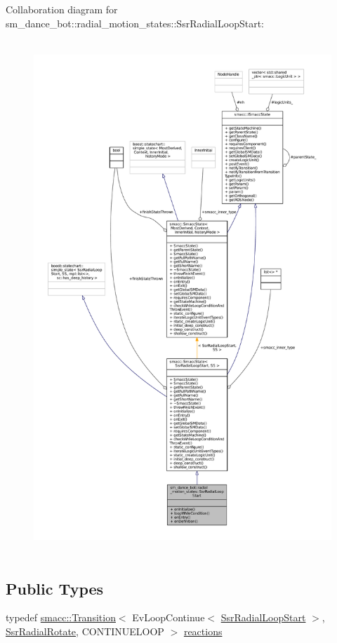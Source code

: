 Collaboration diagram for sm\+\_\+dance\+\_\+bot\+:\+:radial\+\_\+motion\+\_\+states\+:\+:Ssr\+Radial\+Loop\+Start\+:
\nopagebreak
\begin{figure}[H]
\begin{center}
\leavevmode
\includegraphics[height=550pt]{structsm__dance__bot_1_1radial__motion__states_1_1SsrRadialLoopStart__coll__graph}
\end{center}
\end{figure}
\subsection*{Public Types}
\begin{DoxyCompactItemize}
\item 
typedef \hyperlink{classsmacc_1_1Transition}{smacc\+::\+Transition}$<$ Ev\+Loop\+Continue$<$ \hyperlink{structsm__dance__bot_1_1radial__motion__states_1_1SsrRadialLoopStart}{Ssr\+Radial\+Loop\+Start} $>$, \hyperlink{structsm__dance__bot_1_1radial__motion__states_1_1SsrRadialRotate}{Ssr\+Radial\+Rotate}, C\+O\+N\+T\+I\+N\+U\+E\+L\+O\+OP $>$ \hyperlink{structsm__dance__bot_1_1radial__motion__states_1_1SsrRadialLoopStart_a5604a09fcec9a5a6eb4ecc44a97965c6}{reactions}
\end{DoxyCompactItemize}
